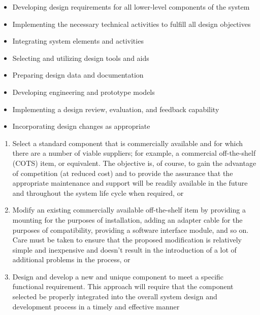 \begin{itemize}
	\item Developing design requirements for all lower-level components of the system
	\item Implementing the necessary technical activities to fulfill all design objectives
	\item Integrating system elements and activities
	\item Selecting and utilizing design tools and aids
	\item Preparing design data and documentation
	\item Developing engineering and prototype models
	\item Implementing a design review, evaluation, and feedback capability
	\item Incorporating design changes as appropriate
\end{itemize}

\begin{enumerate}
	\item Select a standard component that is commercially available and for which there are a number of viable suppliers; for example, a commercial off-the-shelf (COTS) item, or equivalent. The objective is, of course, to gain the advantage of competition (at reduced cost) and to provide the assurance that the appropriate maintenance and support will be readily available in the future and throughout the system life cycle when required, or
	\item Modify an existing commercially available off-the-shelf item by providing a mounting for the purposes of installation, adding an adapter cable for the purposes of compatibility, providing a software interface module, and so on. Care must be taken to ensure that the proposed modification is relatively simple and inexpensive and doesn’t result in the introduction of a lot of additional problems in the process, or
	\item Design and develop a new and unique component to meet a specific functional requirement. This approach will require that the component selected be properly integrated into the overall system design and development process in a timely and effective manner
\end{enumerate}

